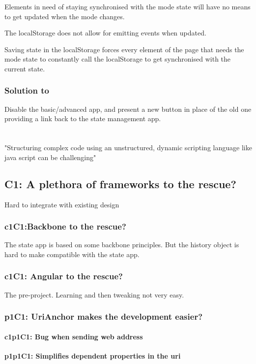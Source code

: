 \documentclass[english]{ifimaster}
\begin{document}
Elements in need of staying synchronised with the mode state will have no means to get updated when the mode changes.

The localStorage does not allow for emitting events when updated.

Saving state in the localStorage forces every element of the page that needs the mode state to constantly call the localStorage to get synchronised with the current state.

\subsection{Solution to } Disable the basic/advanced app, and present a new button in place of the old one providing a link back to the state management app.


\chapter{}
"Structuring complex code using an unstructured, dynamic scripting language like java script can be challenging"
\section{C1: A plethora of frameworks to the rescue?}
Hard to integrate with existing design
\subsection{c1C1:Backbone to the rescue?}
The state app is based on some backbone principles. But the history object is hard to make compatible with the state app. 
\subsection{c1C1: Angular to the rescue?}
The pre-project. Learning and then tweaking not very easy.
\subsection{p1C1: UriAnchor makes the development easier?}
\subsubsection{c1p1C1: Bug when sending web address}
\subsubsection{p1p1C1: Simplifies dependent properties in the uri}
\end{document}
